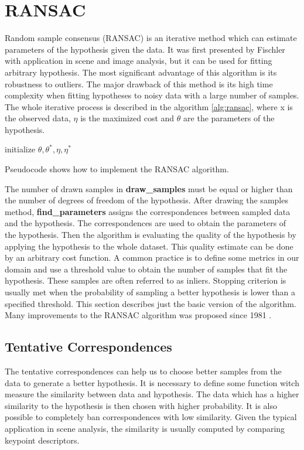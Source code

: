 \section{RANSAC}
Random sample consensus (RANSAC) is an iterative method which can estimate parameters of the hypothesis given the data. It was first presented by Fischler \cite{fischler1981} with application in scene and image analysis, but it can be used for fitting arbitrary hypothesis. The most significant advantage of this algorithm is its robustness to outliers. The major drawback of this method is its high time complexity when fitting hypotheses to noisy data with a large number of samples. The whole iterative process is described in the algorithm \ref{alg:ransac}, where x is the observed data, $\eta$ is the maximized cost and $\theta$ are the parameters of the hypothesis.
\begin{algorithm}[]
 initialize $\theta, \theta^*, \eta, \eta^*$\;
 \caption{Pseudocode shows how to implement the RANSAC algorithm.}
 \label{alg:ransac}
\end{algorithm}

The number of drawn samples in \textbf{draw\_samples} must be equal or higher than the number of degrees of freedom of the hypothesis. After drawing the samples method, \textbf{find\_parameters} assigns the correspondences between sampled data and the hypothesis. The correspondences are used to obtain the parameters of the hypothesis. Then the algorithm is evaluating the quality of the hypothesis by applying the hypothesis to the whole dataset. This quality estimate can be done by an arbitrary cost function. A common practice is to define some metrics in our domain and use a threshold value to obtain the number of samples that fit the hypothesis. These samples are often referred to as inliers. Stopping criterion is usually met when the probability of sampling a better hypothesis is lower than a specified threshold. This section describes just the basic version of the algorithm. Many improvements to the RANSAC algorithm was proposed since 1981 \cite{chum2008}.

\subsection{Tentative Correspondences}
The tentative correspondences can help us to choose better samples from the data to generate a better hypothesis. It is necessary to define some function witch measure the similarity between data and hypothesis. The data which has a higher similarity to the hypothesis is then chosen with higher probability. It is also possible to completely ban correspondences with low similarity. Given the typical application in scene analysis, the similarity is usually computed by comparing keypoint descriptors.

